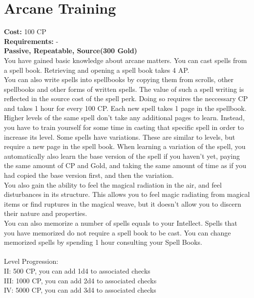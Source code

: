 \section{Arcane Training}
\textbf{Cost:} 100 CP\\
\textbf{Requirements:} -\\
\textbf{Passive, Repeatable, Source(300 Gold)}\\
You have gained basic knowledge about arcane matters. You can cast spells from a spell book. Retrieving and opening a spell book takes 4 AP.\\
You can also write spells into spellbooks by copying them from scrolls, other spellbooks and other forms of written spells. The value of such a spell writing is reflected in the source cost of the spell perk. Doing so requires the neccessary CP and takes 1 hour for every 100 CP. Each new spell takes 1 page in the spellbook. Higher levels of the same spell don't take any additional pages to learn. Instead, you have to train yourself for some time in casting that specific spell in order to increase its level. Some spells have variations. These are similar to levels, but require a new page in the spell book. When learning a variation of the spell, you automatically also learn the base version of the spell if you haven't yet, paying the same amount of CP and Gold, and taking the same amount of time as if you had copied the base version first, and then the variation.\\
You also gain the ability to feel the magical radiation in the air, and feel disturbances in its structure. This allows you to feel magic radiating from magical items or find ruptures in the magical weave, but it doesn't allow you to discern their nature and properties.\\
You can also memorize a number of spells equals to your Intellect. Spells that you have memorized do not require a spell book to be cast. You can change memorized spells by spending 1 hour consulting your Spell Books.\\
\\
Level Progression:\\
II: 500 CP, you can add 1d4 to associated checks\\
III: 1000 CP, you can add 2d4 to associated checks\\
IV: 5000 CP, you can add 3d4 to associated checks\\